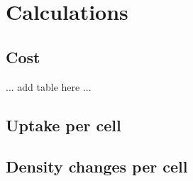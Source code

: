 \documentclass[../main/main]{subfiles}
\begin{document}
\chapter{Calculations}

\section{Cost}
... add table here ...

\section{Uptake per cell}

\section{Density changes per cell}

\end{document}

